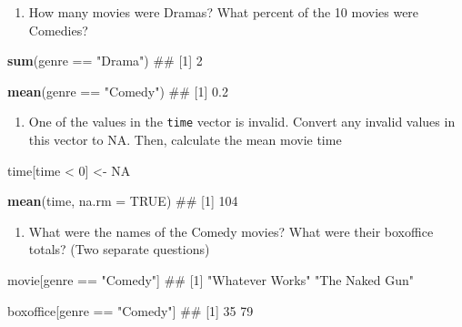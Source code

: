 \documentclass[]{book}
\newenvironment{Shaded}{\begin{snugshade}}{\end{snugshade}}
\newcommand{\KeywordTok}[1]{\textcolor[rgb]{0.13,0.29,0.53}{\textbf{{#1}}}}
\newcommand{\DataTypeTok}[1]{\textcolor[rgb]{0.13,0.29,0.53}{{#1}}}
\newcommand{\DecValTok}[1]{\textcolor[rgb]{0.00,0.00,0.81}{{#1}}}
\newcommand{\StringTok}[1]{\textcolor[rgb]{0.31,0.60,0.02}{{#1}}}
\newcommand{\OtherTok}[1]{\textcolor[rgb]{0.56,0.35,0.01}{{#1}}}
\newcommand{\NormalTok}[1]{{#1}}
\providecommand{\tightlist}{%
  \setlength{\itemsep}{0pt}\setlength{\parskip}{0pt}}
\theoremstyle{definition}
\theoremstyle{definition}
\theoremstyle{remark}
\begin{document}
\begin{enumerate}
\def\labelenumi{\arabic{enumi}.}
\setcounter{enumi}{4}
\tightlist
\item
  How many movies were Dramas? What percent of the 10 movies were
  Comedies?
\end{enumerate}

\begin{Shaded}
\begin{Highlighting}[]
\KeywordTok{sum}\NormalTok{(genre ==}\StringTok{ "Drama"}\NormalTok{)}
\NormalTok{## [1] 2}

\KeywordTok{mean}\NormalTok{(genre ==}\StringTok{ "Comedy"}\NormalTok{)}
\NormalTok{## [1] 0.2}
\end{Highlighting}
\end{Shaded}

\begin{enumerate}
\def\labelenumi{\arabic{enumi}.}
\setcounter{enumi}{5}
\tightlist
\item
  One of the values in the \texttt{time} vector is invalid. Convert any
  invalid values in this vector to NA. Then, calculate the mean movie
  time
\end{enumerate}

\begin{Shaded}
\begin{Highlighting}[]
\NormalTok{time[time <}\StringTok{ }\DecValTok{0}\NormalTok{] <-}\StringTok{ }\OtherTok{NA}

\KeywordTok{mean}\NormalTok{(time, }\DataTypeTok{na.rm =} \OtherTok{TRUE}\NormalTok{)}
\NormalTok{## [1] 104}
\end{Highlighting}
\end{Shaded}

\begin{enumerate}
\def\labelenumi{\arabic{enumi}.}
\setcounter{enumi}{6}
\tightlist
\item
  What were the names of the Comedy movies? What were their boxoffice
  totals? (Two separate questions)
\end{enumerate}

\begin{Shaded}
\begin{Highlighting}[]
\NormalTok{movie[genre ==}\StringTok{ "Comedy"}\NormalTok{]}
\NormalTok{## [1] "Whatever Works" "The Naked Gun"}

\NormalTok{boxoffice[genre ==}\StringTok{ "Comedy"}\NormalTok{]}
\NormalTok{## [1] 35 79}
\end{Highlighting}
\end{Shaded}
\end{document}
